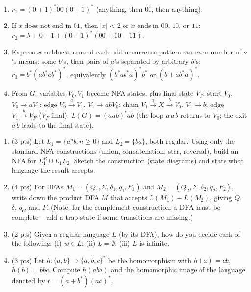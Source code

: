 \documentclass[11pt,a4paper]{article}
\newcounter{prob}
\newenvironment{problem}[1][]{%
  \refstepcounter{prob}%
  \begin{tcolorbox}[enhanced,breakable,colback=white,colframe=SteelBlue!70!black,
      boxrule=0.8pt,arc=1.5mm,left=5pt,right=5pt,top=3pt,bottom=3pt,
      before skip=8pt,after skip=8pt,
      title={\textbf{Question \theprob\ (#1)}},fonttitle=\bfseries, coltitle=white,
      colbacktitle=SteelBlue!70!black, boxed title style={arc=1mm}]}
{\end{tcolorbox}}
\newenvironment{solution}{%
  \begin{tcolorbox}[enhanced,breakable,colback=Honeydew!55,colframe=ForestGreen!60!black,
      boxrule=0.6pt,arc=1.5mm,left=5pt,right=5pt,top=3pt,bottom=3pt,
      before skip=6pt,after skip=10pt,
      title={\textbf{Solution \theprob}},fonttitle=\bfseries, coltitle=white,
      colbacktitle=ForestGreen!60!black, boxed title style={arc=1mm}]}
{\end{tcolorbox}}
\begin{document}
\begin{solution}
\begin{enumerate}[label=(\alph*)]
  \item $r_1=(0+1)^*00(0+1)^*$ (anything, then $00$, then anything).
  \item If $x$ does not end in $01$, then $|x|<2$ or $x$ ends in
  $00$, $10$, or $11$: $r_2=\lambda+0+1+(0+1)^*(00+10+11)$.
  \item Express $x$ as blocks around each odd occurrence pattern:
  an even number of $a$'s means: some $b$'s, then pairs of $a$'s
  separated by arbitrary $b$'s: $r_3=b^*(ab^*ab^*)^*$, equivalently
  $(b^*ab^*a)^*b^*$ or $(b+ab^*a)^*$.
  \item From $G$: variables $V_0,V_1$ become NFA states, plus final
  state $V_F$; start $V_0$. $V_0\to aV_1$: edge $V_0\overset{a}{\to}V_1$.
  $V_1\to abV_0$: chain $V_1\overset{a}{\to}X\overset{b}{\to}V_0$.
  $V_1\to b$: edge $V_1\overset{b}{\to}V_F$ ($V_F$ final).
  $L(G)=(aab)^*ab$ (the loop $a\,a\,b$ returns to $V_0$; the exit
  $a\,b$ leads to the final state).
\end{enumerate}
\end{solution}

\begin{problem}[Closure Properties and Decision Questions -- 12 points]
\begin{enumerate}[label=(\alph*)]
  \item (3 pts) Let $L_1=\{a^nb:n\ge0\}$ and $L_2=\{ba\}$, both regular. Using only the standard NFA constructions (union, concatenation, star, reversal), build an NFA for $L_1^R\cup L_1L_2$. Sketch the construction (state diagrams) and state what language the result accepts.
  \item (4 pts) For DFAs $M_1=(Q_1,\Sigma,\delta_1,q_1,F_1)$ and
  $M_2=(Q_2,\Sigma,\delta_2,q_2,F_2)$, write down the product DFA $M$
  that accepts $L(M_1)-L(M_2)$, giving $Q$, $\delta$, $q_0$, and $F$.
  (Note: for the complement construction, a DFA must be complete --
  add a trap state if some transitions are missing.)
  \item (2 pts) Given a regular language $L$ (by its DFA), how do you decide each of the following: (i) $w\in L$; (ii) $L=\emptyset$; (iii) $L$ is infinite.
  \item (3 pts) Let $h:\{a,b\}\to\{a,b,c\}^*$ be the homomorphism with $h(a)=ab$, $h(b)=bbc$. Compute $h(aba)$ and the homomorphic image of the language denoted by $r=(a+b^*)(aa)^*$.
\end{enumerate}
\end{problem}
\end{document}
